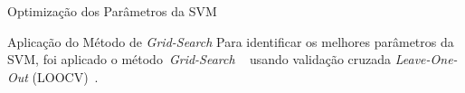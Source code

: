 \documentclass{beamer}
\begin{document}

\begin{frame}{Optimização dos Parâmetros da SVM}
 \begin{block}{Aplicação do Método de \textit{Grid-Search}}
 Para identificar os melhores parâmetros da SVM, foi aplicado o método~\textit{Grid-Search} ~\cite{gridsearchsvm2010} usando validação cruzada \textit{Leave-One-Out} (LOOCV)~\cite{kantardzic2011data}.   
 \end{block}
\end{frame}









\end{document}
